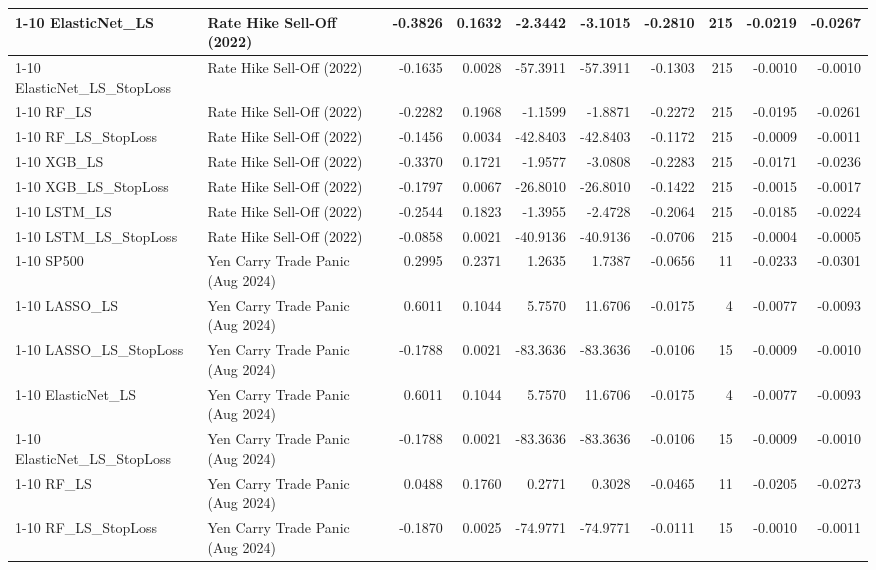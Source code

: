 \begin{tabular}{llrrrrrrrr}
\cline{1-10}
ElasticNet\_LS & Rate Hike Sell-Off (2022) & -0.3826 & 0.1632 & -2.3442 & -3.1015 & -0.2810 & 215 & -0.0219 & -0.0267 \\
\cline{1-10}
ElasticNet\_LS\_StopLoss & Rate Hike Sell-Off (2022) & -0.1635 & 0.0028 & -57.3911 & -57.3911 & -0.1303 & 215 & -0.0010 & -0.0010 \\
\cline{1-10}
RF\_LS & Rate Hike Sell-Off (2022) & -0.2282 & 0.1968 & -1.1599 & -1.8871 & -0.2272 & 215 & -0.0195 & -0.0261 \\
\cline{1-10}
RF\_LS\_StopLoss & Rate Hike Sell-Off (2022) & -0.1456 & 0.0034 & -42.8403 & -42.8403 & -0.1172 & 215 & -0.0009 & -0.0011 \\
\cline{1-10}
XGB\_LS & Rate Hike Sell-Off (2022) & -0.3370 & 0.1721 & -1.9577 & -3.0808 & -0.2283 & 215 & -0.0171 & -0.0236 \\
\cline{1-10}
XGB\_LS\_StopLoss & Rate Hike Sell-Off (2022) & -0.1797 & 0.0067 & -26.8010 & -26.8010 & -0.1422 & 215 & -0.0015 & -0.0017 \\
\cline{1-10}
LSTM\_LS & Rate Hike Sell-Off (2022) & -0.2544 & 0.1823 & -1.3955 & -2.4728 & -0.2064 & 215 & -0.0185 & -0.0224 \\
\cline{1-10}
LSTM\_LS\_StopLoss & Rate Hike Sell-Off (2022) & -0.0858 & 0.0021 & -40.9136 & -40.9136 & -0.0706 & 215 & -0.0004 & -0.0005 \\
\cline{1-10}
SP500 & Yen Carry Trade Panic (Aug 2024) & 0.2995 & 0.2371 & 1.2635 & 1.7387 & -0.0656 & 11 & -0.0233 & -0.0301 \\
\cline{1-10}
LASSO\_LS & Yen Carry Trade Panic (Aug 2024) & 0.6011 & 0.1044 & 5.7570 & 11.6706 & -0.0175 & 4 & -0.0077 & -0.0093 \\
\cline{1-10}
LASSO\_LS\_StopLoss & Yen Carry Trade Panic (Aug 2024) & -0.1788 & 0.0021 & -83.3636 & -83.3636 & -0.0106 & 15 & -0.0009 & -0.0010 \\
\cline{1-10}
ElasticNet\_LS & Yen Carry Trade Panic (Aug 2024) & 0.6011 & 0.1044 & 5.7570 & 11.6706 & -0.0175 & 4 & -0.0077 & -0.0093 \\
\cline{1-10}
ElasticNet\_LS\_StopLoss & Yen Carry Trade Panic (Aug 2024) & -0.1788 & 0.0021 & -83.3636 & -83.3636 & -0.0106 & 15 & -0.0009 & -0.0010 \\
\cline{1-10}
RF\_LS & Yen Carry Trade Panic (Aug 2024) & 0.0488 & 0.1760 & 0.2771 & 0.3028 & -0.0465 & 11 & -0.0205 & -0.0273 \\
\cline{1-10}
RF\_LS\_StopLoss & Yen Carry Trade Panic (Aug 2024) & -0.1870 & 0.0025 & -74.9771 & -74.9771 & -0.0111 & 15 & -0.0010 & -0.0011 \\

\end{tabular}
